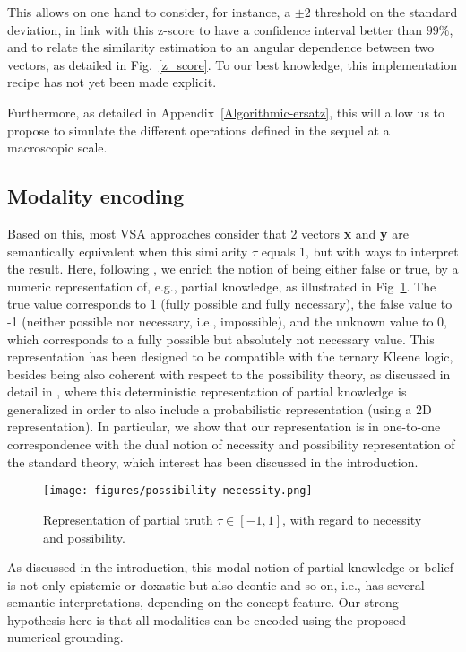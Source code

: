\documentclass[sn-mathphys]{sn-jnl}
\begin{document}
This allows on one hand to consider, for instance, a $\pm 2$ threshold on the standard deviation, in link with this z-score to have a confidence interval better than $99\%$, and to relate the similarity estimation to an angular dependence between two vectors, as detailed in Fig.~\ref{z_score}. To our best knowledge, this implementation recipe has not yet been made explicit.

Furthermore, as detailed in Appendix~\ref{Algorithmic-ersatz}, this will allow us to propose to simulate the different operations defined in the sequel at a macroscopic scale.

\subsection{Modality encoding}

Based on this, most VSA approaches consider that 2 vectors \textbf{x} and \textbf{y} are semantically equivalent when this similarity $\tau$ equals 1, but with ways to interpret the result. Here, following \cite{mercier_ontology_2021}, we enrich the notion of being either false or true, by a numeric representation of, e.g., partial knowledge, as illustrated in Fig~\ref{possibility-necessity}. The true value corresponds to 1 (fully possible and fully necessary), the false value to -1 (neither possible nor necessary, i.e., impossible), and the unknown value to 0, which corresponds to a fully possible but absolutely not necessary value. This representation has been designed to be compatible with the ternary Kleene logic, besides being also coherent with respect to the possibility theory, as discussed in detail in \cite{vieville_representation_2022}, where this deterministic representation of partial knowledge is generalized in order to also include a probabilistic representation (using a 2D representation). In particular, we show that our representation is in one-to-one correspondence with the dual notion of necessity and possibility representation of the standard theory, which interest has been discussed in the introduction.

\begin{figure}[htbp]
\centerline{\texttt{[image: figures/possibility-necessity.png]}}
\caption{Representation of partial truth $\tau \in [-1,1]$, with regard to necessity and possibility.}
\label{possibility-necessity}
\end{figure}

As discussed in the introduction, this modal notion of partial knowledge or belief is not only epistemic or doxastic but also deontic and so on, i.e., has several semantic interpretations, depending on the concept feature. Our strong hypothesis here is that all modalities can be encoded using the proposed numerical grounding. 
\end{document}
